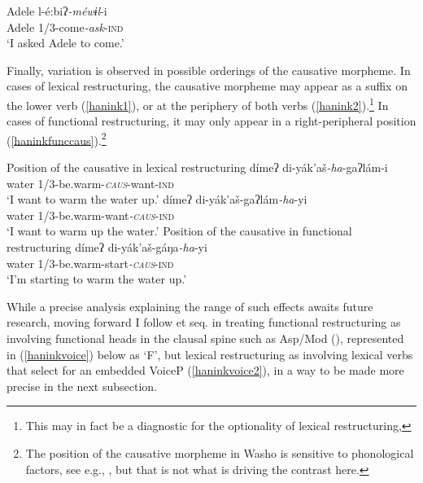 \documentclass[output=paper]{langscibook}
\begin{document}
\ea
\gll Adele l-é:biʔ{\itshape -méwɨl}-i\\
Adele 1/3-come{\itshape -ask}-{\scshape ind}\\
\glt `I asked Adele to come.' \label{haninkobjectcontrol}
\z 


Finally, variation is observed in possible orderings of the causative morpheme. In cases of lexical restructuring, the causative morpheme may appear as a suffix on the lower verb (\ref{hanink1}), or at the periphery of both verbs (\ref{hanink2}).\footnote{This may in fact be a diagnostic for the optionality of lexical restructuring, } In cases of functional restructuring, it may only appear in a right-peripheral position (\ref{haninkfunccaus}).\footnote{The position of the causative morpheme in Washo is sensitive to phonological factors, see e.g.,  \citealt{jacobsen1973,benz2018}, but that is not what is driving the contrast here.} 

\ea Position of the causative in lexical restructuring
\ea \gll dímeʔ di-yák'aš{\itshape-ha}-gaʔlám-i\\
water 1/3-be.warm-\textit{\textsc{caus}}-want{\scshape-ind}\\
\glt `I want to warm the water up.' \label{hanink1}
\ex \gll dímeʔ di-yák'aš-gaʔlám{\itshape -ha}-yi\\
water 1/3-be.warm-want\textit{\textsc{-caus}}{\scshape-ind}\\
\glt `I want to warm up the water.' \label{hanink2}
\z
\ex Position of the causative in functional restructuring\label{haninkfunccaus}
\ea \gll dímeʔ di-yák'aš-gáŋa{\itshape-ha}-yi\\
water 1/3-be.warm-start\textit{\textsc{-caus}}{\scshape-ind}\\
\glt `I'm starting to warm the water up.' \label{hanink3}
\z
\z



While a precise analysis explaining the range of such effects awaits future research, moving forward I follow \citealt{wurmbrand2001} et seq. in treating functional restructuring as involving functional heads in the clausal spine such as Asp/Mod (\citealt{cinque2001,cinque2004,grano2012diss}), represented in (\ref{haninkvoice}) below as `F', but lexical restructuring as involving lexical verbs that select for an embedded VoiceP (\ref{haninkvoice2}), in a way to be made more precise in the next subsection.
\end{document}
